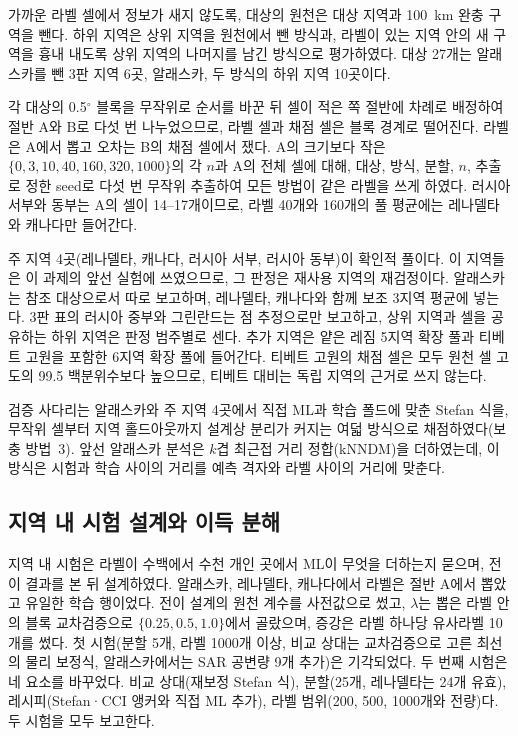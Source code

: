 가까운 라벨 셀에서 정보가 새지 않도록, 대상의 원천은 대상 지역과 100~km 완충 구역을 뺀다. 하위 지역은 상위 지역을 원천에서 뺀 방식과, 라벨이 있는 지역 안의 새 구역을 흉내 내도록 상위 지역의 나머지를 남긴 방식으로 평가하였다. 대상 27개는 알래스카를 뺀 3판 지역 6곳, 알래스카, 두 방식의 하위 지역 10곳이다.

각 대상의 0.5$^{\circ}$ 블록을 무작위로 순서를 바꾼 뒤 셀이 적은 쪽 절반에 차례로 배정하여 절반 A와 B로 다섯 번 나누었으므로, 라벨 셀과 채점 셀은 블록 경계로 떨어진다\cite{Roberts2017}. 라벨은 A에서 뽑고 오차는 B의 채점 셀에서 쟀다. A의 크기보다 작은 $\{0, 3, 10, 40, 160, 320, 1000\}$의 각 $n$과 A의 전체 셀에 대해, 대상, 방식, 분할, $n$, 추출로 정한 seed로 다섯 번 무작위 추출하여 모든 방법이 같은 라벨을 쓰게 하였다. 러시아 서부와 동부는 A의 셀이 14--17개이므로, 라벨 40개와 160개의 풀 평균에는 레나델타와 캐나다만 들어간다.

주 지역 4곳(레나델타, 캐나다, 러시아 서부, 러시아 동부)이 확인적 풀이다. 이 지역들은 이 과제의 앞선 실험에 쓰였으므로, 그 판정은 재사용 지역의 재검정이다. 알래스카는 참조 대상으로서 따로 보고하며, 레나델타, 캐나다와 함께 보조 3지역 평균에 넣는다. 3판 표의 러시아 중부와 그린란드는 점 추정으로만 보고하고, 상위 지역과 셀을 공유하는 하위 지역은 판정 범주별로 센다. 추가 지역은 얕은 레짐 5지역 확장 풀과 티베트 고원을 포함한 6지역 확장 풀에 들어간다. 티베트 고원의 채점 셀은 모두 원천 셀 고도의 99.5 백분위수보다 높으므로, 티베트 대비는 독립 지역의 근거로 쓰지 않는다.

검증 사다리는 알래스카와 주 지역 4곳에서 직접 ML과 학습 폴드에 맞춘 Stefan 식을, 무작위 셀부터 지역 홀드아웃까지 설계상 분리가 커지는 여덟 방식으로 채점하였다(보충 방법~3). 앞선 알래스카 분석은 $k$겹 최근접 거리 정합(kNNDM)\cite{Linnenbrink2024}을 더하였는데, 이 방식은 시험과 학습 사이의 거리를 예측 격자와 라벨 사이의 거리에 맞춘다.

\subsection{지역 내 시험 설계와 이득 분해}\label{sec:m-within}

지역 내 시험은 라벨이 수백에서 수천 개인 곳에서 ML이 무엇을 더하는지 묻으며, 전이 결과를 본 뒤 설계하였다. 알래스카, 레나델타, 캐나다에서 라벨은 절반 A에서 뽑았고 유일한 학습 행이었다. 전이 설계의 원천 계수를 사전값으로 썼고, $\lambda$는 뽑은 라벨 안의 블록 교차검증으로 $\{0.25, 0.5, 1.0\}$에서 골랐으며, 증강은 라벨 하나당 유사라벨 10개를 썼다. 첫 시험(분할 5개, 라벨 1000개 이상, 비교 상대는 교차검증으로 고른 최선의 물리 보정식, 알래스카에서는 SAR 공변량 9개 추가)은 기각되었다. 두 번째 시험은 네 요소를 바꾸었다. 비교 상대(재보정 Stefan 식), 분할(25개, 레나델타는 24개 유효), 레시피(Stefan·CCI 앵커와 직접 ML 추가), 라벨 범위(200, 500, 1000개와 전량)다. 두 시험을 모두 보고한다.


